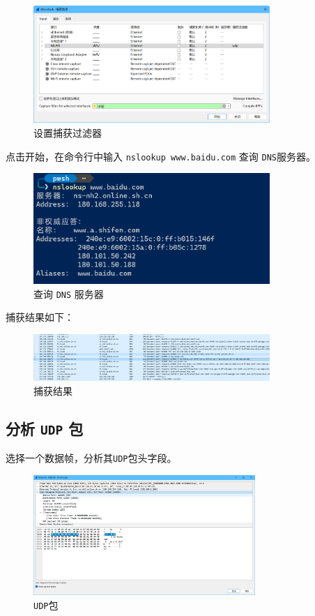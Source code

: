 \documentclass{article}
\begin{document}
\begin{figure}[H]
  \centering
  \includegraphics[width=0.8\textwidth]{img/1.png}
  \caption{设置捕获过滤器}
\end{figure}

点击开始，在命令行中输入 \texttt{nslookup www.baidu.com} 查询 \texttt{DNS}服务器。

\begin{figure}[H]
  \centering
  \includegraphics[width=0.8\textwidth]{img/2.png}
  \caption{查询 \texttt{DNS} 服务器}
\end{figure}

捕获结果如下：

\begin{figure}[H]
  \centering
  \includegraphics[width=0.8\textwidth]{img/3.png}
  \caption{捕获结果}
\end{figure}

\subsection{分析 \texttt{UDP} 包}

选择一个数据帧，分析其\texttt{UDP}包头字段。

\begin{figure}[H]
  \centering
  \includegraphics[width=0.75\textwidth]{img/4.png}
  \caption{\texttt{UDP}包}
\end{figure}
\end{document}
